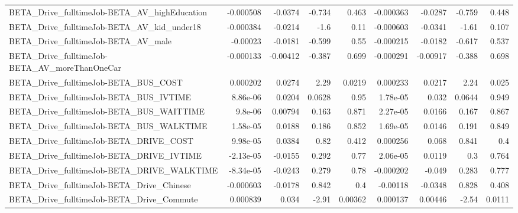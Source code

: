 \begin{tabular}{lrrrrrrrr}
BETA\_Drive\_fulltimeJob-BETA\_AV\_highEducation       &   -0.000508 &      -0.0374 &   -0.734 &    0.463 &  -0.000363 &     -0.0287 &       -0.759 &         0.448 \\
BETA\_Drive\_fulltimeJob-BETA\_AV\_kid\_under18         &   -0.000384 &      -0.0214 &     -1.6 &     0.11 &  -0.000603 &     -0.0341 &        -1.61 &         0.107 \\
BETA\_Drive\_fulltimeJob-BETA\_AV\_male                &    -0.00023 &      -0.0181 &   -0.599 &     0.55 &  -0.000215 &     -0.0182 &       -0.617 &         0.537 \\
BETA\_Drive\_fulltimeJob-BETA\_AV\_moreThanOneCar      &   -0.000133 &     -0.00412 &   -0.387 &    0.699 &  -0.000291 &    -0.00917 &       -0.388 &         0.698 \\
BETA\_Drive\_fulltimeJob-BETA\_BUS\_COST               &    0.000202 &       0.0274 &     2.29 &   0.0219 &   0.000233 &      0.0217 &         2.24 &         0.025 \\
BETA\_Drive\_fulltimeJob-BETA\_BUS\_IVTIME             &    8.86e-06 &       0.0204 &   0.0628 &     0.95 &   1.78e-05 &       0.032 &       0.0644 &         0.949 \\
BETA\_Drive\_fulltimeJob-BETA\_BUS\_WAITTIME           &     9.8e-06 &      0.00794 &    0.163 &    0.871 &   2.27e-05 &      0.0166 &        0.167 &         0.867 \\
BETA\_Drive\_fulltimeJob-BETA\_BUS\_WALKTIME           &    1.58e-05 &       0.0188 &    0.186 &    0.852 &   1.69e-05 &      0.0146 &        0.191 &         0.849 \\
BETA\_Drive\_fulltimeJob-BETA\_DRIVE\_COST             &    9.98e-05 &       0.0384 &     0.82 &    0.412 &   0.000256 &       0.068 &        0.841 &           0.4 \\
BETA\_Drive\_fulltimeJob-BETA\_DRIVE\_IVTIME           &   -2.13e-05 &      -0.0155 &    0.292 &     0.77 &   2.06e-05 &      0.0119 &          0.3 &         0.764 \\
BETA\_Drive\_fulltimeJob-BETA\_DRIVE\_WALKTIME         &   -8.34e-05 &      -0.0243 &    0.279 &     0.78 &  -0.000202 &      -0.049 &        0.283 &         0.777 \\
BETA\_Drive\_fulltimeJob-BETA\_Drive\_Chinese          &   -0.000603 &      -0.0178 &    0.842 &      0.4 &   -0.00118 &     -0.0348 &        0.828 &         0.408 \\
BETA\_Drive\_fulltimeJob-BETA\_Drive\_Commute          &    0.000839 &        0.034 &    -2.91 &  0.00362 &   0.000137 &     0.00446 &        -2.54 &        0.0111 \\

\end{tabular}

